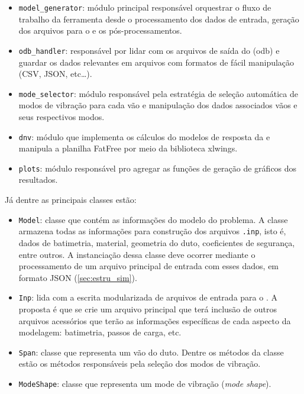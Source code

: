 \begin{itemize}
    \item \texttt{model\_generator}: módulo principal responsável orquestrar o fluxo de trabalho da ferramenta desde o processamento dos dados de entrada, geração dos arquivos para o \abaqus e os pós-processamentos.

    \item \texttt{odb\_handler}: responsável por lidar com os arquivos de saída do \abaqus (odb) e guardar os dados relevantes em arquivos com formatos de fácil manipulação (CSV, JSON, etc\ldots).

    \item \texttt{mode\_selector}: módulo responsável pela estratégia de seleção automática de modos de vibração para cada vão e manipulação dos dados associados vãos e seus respectivos modos.

    \item \texttt{dnv}: módulo que implementa os cálculos do modelos de resposta da  e manipula a planilha FatFree por meio da biblioteca xlwings.

    \item \texttt{plots}: módulo responsável pro agregar as funções de geração de gráficos dos resultados.
\end{itemize}

Já dentre as principais classes estão:

\begin{itemize}
    \item \texttt{Model}: classe que contém as informações do modelo do problema.
    A classe armazena todas as informações para construção dos arquivos \texttt{.inp}, isto é, dados de batimetria, material, geometria do duto, coeficientes de segurança, entre outros.
    A instanciação dessa classe deve ocorrer mediante o processamento de um arquivo principal de entrada com esses dados, em formato JSON (\autoref{sec:estru_sim}).

    \item \texttt{Inp}: lida com a escrita modularizada de arquivos de entrada  para o \abaqus. A proposta é que se crie um arquivo principal que terá inclusão de outros arquivos acessórios que terão as informações específicas de cada aspecto da modelagem: batimetria, passos de carga, etc.

    \item \texttt{Span}: classe que representa um vão do duto. Dentre os métodos da classe estão os métodos responsáveis pela seleção dos modos de vibração.

    \item \texttt{ModeShape}: classe que representa um mode de vibração (\textit{mode shape}).
\end{itemize}

